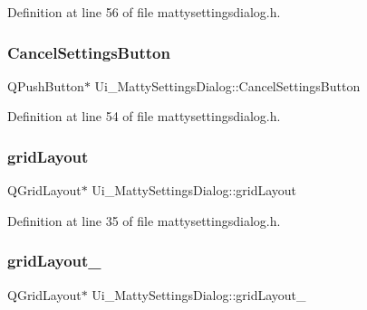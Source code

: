 Definition at line 56 of file mattysettingsdialog.\+h.

\hypertarget{classUi__MattySettingsDialog_accbbae55ca7da2a96085f5c288e0de91}{}\label{classUi__MattySettingsDialog_accbbae55ca7da2a96085f5c288e0de91} 
\subsubsection{\texorpdfstring{Cancel\+Settings\+Button}{CancelSettingsButton}}
{\footnotesize\ttfamily Q\+Push\+Button$\ast$ Ui\+\_\+\+Matty\+Settings\+Dialog\+::\+Cancel\+Settings\+Button}



Definition at line 54 of file mattysettingsdialog.\+h.

\hypertarget{classUi__MattySettingsDialog_a12c748325b36f553442171a4b8708c26}{}\label{classUi__MattySettingsDialog_a12c748325b36f553442171a4b8708c26} 
\subsubsection{\texorpdfstring{grid\+Layout}{gridLayout}}
{\footnotesize\ttfamily Q\+Grid\+Layout$\ast$ Ui\+\_\+\+Matty\+Settings\+Dialog\+::grid\+Layout}



Definition at line 35 of file mattysettingsdialog.\+h.

\hypertarget{classUi__MattySettingsDialog_aedb2292c10e9456af605ac6d693e032b}{}\label{classUi__MattySettingsDialog_aedb2292c10e9456af605ac6d693e032b} 
\subsubsection{\texorpdfstring{grid\+Layout\+\_}{gridLayout\_2}}
{\footnotesize\ttfamily Q\+Grid\+Layout$\ast$ Ui\+\_\+\+Matty\+Settings\+Dialog\+::grid\+Layout\+\_}



